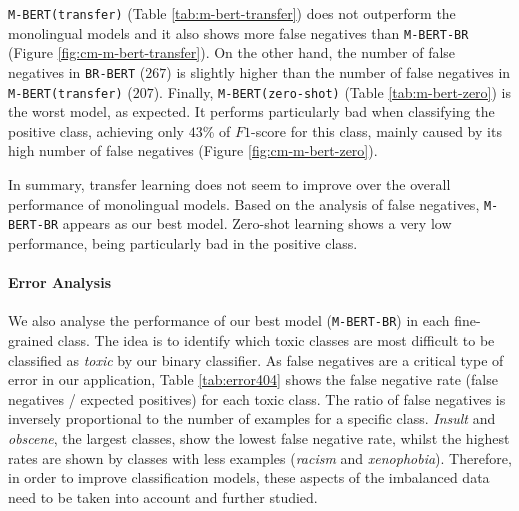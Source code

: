 \documentclass[11pt,a4paper]{article}
\begin{document}
\texttt{M-BERT(transfer)} (Table \ref{tab:m-bert-transfer}) does not outperform the monolingual models and it also shows more false negatives than \texttt{M-BERT-BR} (Figure \ref{fig:cm-m-bert-transfer}). On the other hand, the number of false negatives in \texttt{BR-BERT} ($267$) is slightly higher than the number of false negatives in \texttt{M-BERT(transfer)} ($207$). Finally, \texttt{M-BERT(zero-shot)} (Table \ref{tab:m-bert-zero}) is the worst model, as expected. It performs particularly bad when classifying the positive class, achieving only $43$\% of $F1$-score for this class, mainly caused by its high number of false negatives (Figure \ref{fig:cm-m-bert-zero}).






















In summary, transfer learning does not seem to improve over the overall performance of monolingual models. Based on the analysis of false negatives, \texttt{M-BERT-BR} appears as our best model. Zero-shot learning shows a very low performance, being particularly bad in the positive class.

\paragraph{Error Analysis}
We also analyse the performance of our best model (\texttt{M-BERT-BR}) in each fine-grained class. The idea is to identify which toxic classes are most difficult to be classified as \textit{toxic} by our binary classifier. As false negatives are a critical type of error in our application, Table \ref{tab:error404} shows the false negative rate (false negatives / expected positives) for each toxic class. The ratio of false negatives is inversely proportional to the number of examples for a specific class. \textit{Insult} and \textit{obscene}, the largest classes, show the lowest false negative rate, whilst the highest rates are shown by classes with less examples (\textit{racism} and \textit{xenophobia}). Therefore, in order to improve classification models, these aspects of the imbalanced data need to be taken into account and further studied.  
\end{document}
